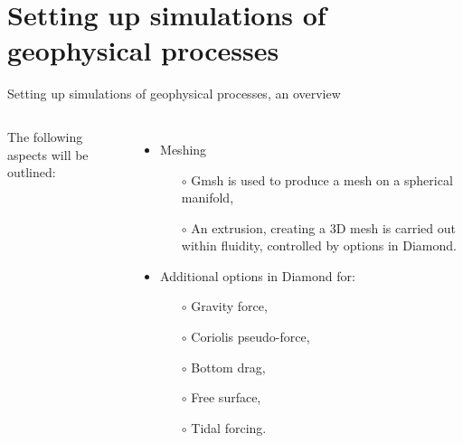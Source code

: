 \section{Setting up simulations of geophysical processes}

\begin{frame}{Setting up simulations of geophysical processes, an overview}
\begin{columns}[l]

\column{3.5in}
The following aspects will be outlined:
  \begin{itemize}
     \item Meshing 
        \begin{itemize}
        \item[$\circ$] Gmsh is used to produce a mesh on a spherical manifold,
        \item[$\circ$] An extrusion, creating a 3D mesh is carried out within fluidity,
              controlled by options in Diamond.
     \end{itemize}
     \item Additional options in Diamond for:
     \begin{itemize}
        \item[$\circ$] Gravity force,
        \item[$\circ$] Coriolis pseudo-force,
        \item[$\circ$] Bottom drag,
        \item[$\circ$] Free surface,
        \item[$\circ$] Tidal forcing.
     \end{itemize}

  \end{itemize}



\end{columns}
\end{frame}
